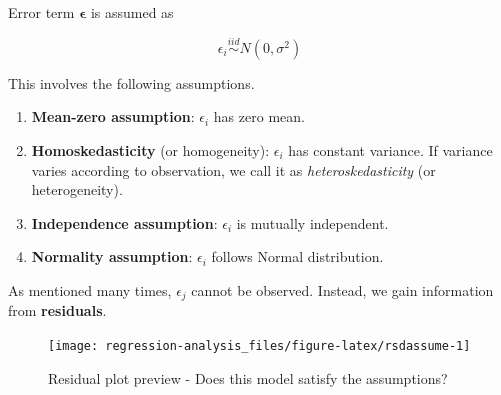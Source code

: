 \documentclass[]{book}
\newenvironment{Shaded}{\begin{snugshade}}{\end{snugshade}}
\newcommand{\DataTypeTok}[1]{\textcolor[rgb]{0.13,0.29,0.53}{#1}}
\newcommand{\DecValTok}[1]{\textcolor[rgb]{0.00,0.00,0.81}{#1}}
\newcommand{\KeywordTok}[1]{\textcolor[rgb]{0.13,0.29,0.53}{\textbf{#1}}}
\newcommand{\NormalTok}[1]{#1}
\newcommand{\OperatorTok}[1]{\textcolor[rgb]{0.81,0.36,0.00}{\textbf{#1}}}
\newcommand{\StringTok}[1]{\textcolor[rgb]{0.31,0.60,0.02}{#1}}
\providecommand{\tightlist}{%
  \setlength{\itemsep}{0pt}\setlength{\parskip}{0pt}}
\newcommand{\E}{\boldsymbol\epsilon}
\theoremstyle{definition}
\theoremstyle{definition}
\theoremstyle{definition}
\theoremstyle{remark}
\begin{document}
Error term \(\E\) is assumed as

\[\epsilon_i \stackrel{iid}{\sim}N(0, \sigma^2)\]

This involves the following assumptions.

\begin{enumerate}
\def\labelenumi{\arabic{enumi}.}
\tightlist
\item
  \textbf{Mean-zero assumption}: \(\epsilon_i\) has zero mean.
\item
  \textbf{Homoskedasticity} (or homogeneity): \(\epsilon_i\) has constant variance. If variance varies according to observation, we call it as \emph{heteroskedasticity} (or heterogeneity).
\item
  \textbf{Independence assumption}: \(\epsilon_i\) is mutually independent.
\item
  \textbf{Normality assumption}: \(\epsilon_i\) follows Normal distribution.
\end{enumerate}

As mentioned many times, \(\epsilon_j\) cannot be observed. Instead, we gain information from \textbf{residuals}.

\begin{Shaded}
\end{Shaded}

\begin{figure}[H]

{\centering \texttt{[image: regression-analysis\_files/figure-latex/rsdassume-1]} 

}

\caption{Residual plot preview - Does this model satisfy the assumptions?}\label{fig:rsdassume}
\end{figure}
\end{document}
